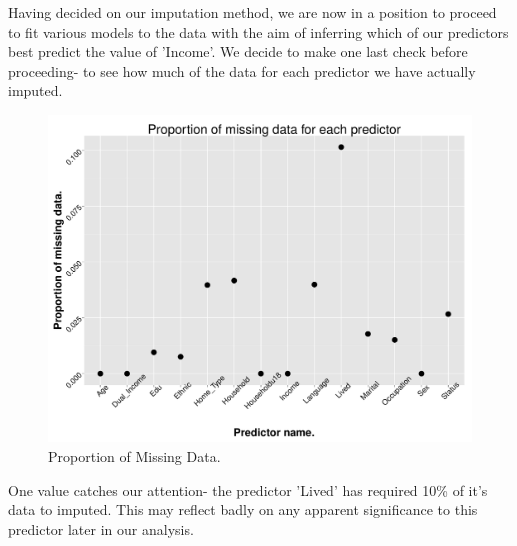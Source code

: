 \documentclass[11pt]{article}
\begin{document}
Having decided on our imputation method, we are now in a position to proceed to fit various models to the data with the aim of inferring which of our predictors best predict the value of 'Income'. We decide to make one last check before proceeding- to see how much of the data for each predictor we have actually imputed.



\begin{figure}[h!]
  \caption{Proportion of Missing Data.}
  \centering
    \includegraphics[width=1.0\textwidth]{PropMissingData.pdf}
\end{figure}


One value catches our attention- the predictor 'Lived' has required 10\% of it's data to imputed. This may reflect badly on any apparent significance to this predictor later in our analysis.
\end{document}

